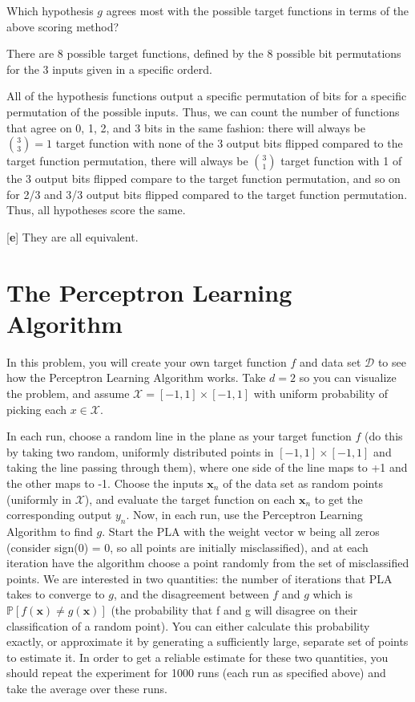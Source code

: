 \documentclass[answers]{exam}
\begin{document}
\begin{questions}
\setcounter{question}{5}

\question Which hypothesis $g$ agrees most with the possible target functions in terms
of the above scoring method?

\begin{solution}
There are 8 possible target functions, defined by the 8 possible bit permutations 
for the 3 inputs given in a specific orderd.

All of the hypothesis functions output a specific permutation of bits for a 
specific permutation of the possible inputs. Thus, we can count the number of 
functions that agree on 0, 1, 2, and 3 bits in the same fashion: there will
always be ${3 \choose 3} = 1$ target function with none of the 3 output bits
flipped compared to the target function permutation, there will always be
${3 \choose 1}$ target function with 1 of the 3 output bits flipped 
compare to the target function permutation, and so on for 2/3 and 3/3 output
bits flipped compared to the target function permutation. Thus, all hypotheses
score the same. 

{[\textbf{e}]} They are all equivalent.
\end{solution}
\end{questions}

\section{The Perceptron Learning Algorithm}

In this problem, you will create your own target function $f$ and data set 
$\mathcal{D}$ to see how the Perceptron Learning Algorithm works. Take $d=2$ 
so you can visualize the problem, and assume $\mathcal{X} = [-1, 1] \times 
[-1, 1]$ with uniform probability of picking each $x \in \mathcal{X}$.

In each run, choose a random line in the plane as your target function $f$ 
(do this by taking two random, uniformly distributed points in $[-1, 1] \times
[-1, 1]$ and taking the line passing through them), where one side of the line 
maps to +1 and the other maps to -1. Choose the inputs $\textbf{x}_{n}$ of the 
data set as random points (uniformly in $\mathcal{X}$), and evaluate the target 
function on each $\textbf{x}_{n}$ to get the corresponding output $y_{n}$. 
Now, in each run, use the Perceptron Learning Algorithm to find $g$. Start the 
PLA with the weight vector w being all zeros (consider sign(0) = 0, so all 
points are initially misclassified), and at each iteration have the algorithm 
choose a point randomly from the set of misclassified points. We are interested 
in two quantities: the number of iterations that PLA takes to converge to $g$, 
and the disagreement between $f$ and $g$ which is $\mathbb{P}[f(\textbf{x}) \neq 
g(\textbf{x})]$ (the probability that f and g will disagree on their 
classification of a random point). You can either calculate this probability 
exactly, or approximate it by generating a sufficiently large, separate set 
of points to estimate it. In order to get a reliable estimate for these two 
quantities, you should repeat the experiment for 1000 runs (each run as 
specified above) and take the average over these runs.
\end{document}
